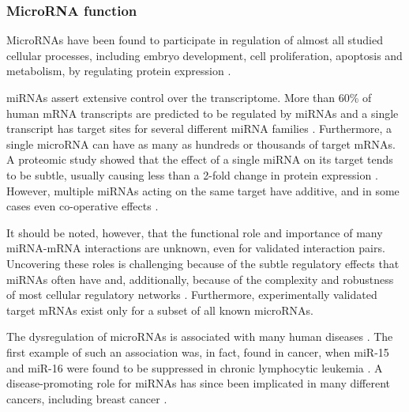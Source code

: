 \subsubsection{MicroRNA function}\label{microrna-function}

MicroRNAs have been found to participate in regulation of almost all studied
cellular processes, including embryo development, cell proliferation,
apoptosis and metabolism, by regulating protein expression \cite{}.

miRNAs assert extensive control over the transcriptome. More than 60\% of
human mRNA transcripts are predicted to be regulated by miRNAs and a single
transcript has target sites for several different miRNA families
\citep{Friedman2009}. Furthermore, a single microRNA can have as many as hundreds or
thousands of target mRNAs. A proteomic study showed that the effect of a
single miRNA on its target tends to be subtle, usually causing less than a
2-fold change in protein expression \citep{Baek2008}. However, multiple miRNAs
acting on the same target have additive, and in some cases even co-operative
effects \citep{Bartel2009}.



It should be noted, however, that the functional role and importance of many
miRNA-mRNA interactions are unknown, even for validated interaction pairs.
Uncovering these roles is challenging because of the subtle regulatory effects
that miRNAs often have and, additionally, because of the complexity and
robustness of most cellular regulatory networks \citep{Bartel2009}.
Furthermore, experimentally validated target mRNAs exist only for a subset of
all known microRNAs.

The dysregulation of microRNAs is associated with many human diseases
\citep{Jiang2009,VAIHDATÄMÄREFE}. The first example of such an association was, in
fact, found in cancer, when miR-15 and miR-16 were found to be suppressed in
chronic lymphocytic leukemia \citep{Musilova2015}. A disease-promoting role
for miRNAs has since been implicated in many different cancers, including
breast cancer \citep{Melo2011}.









